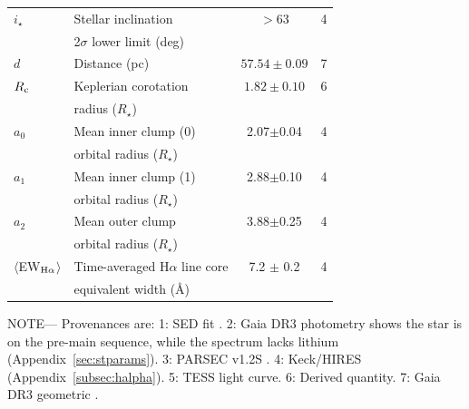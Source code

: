 \documentclass[11pt,twocolumn,tighten,linenumbers]{aastex7}
\begin{document}
\begin{table}
\begin{tabular}{llcc}
%
$i_\star$\dotfill                       & Stellar inclination\dotfill                                    & 	$>$63           & 4 \\
                                        & \hspace{3pt}  2$\sigma$ lower limit (deg)	                     &                      \\
%
$d$\dotfill                             & Distance (pc)\dotfill                                          & $57.54 \pm 0.09$ & 7 \\
%
$R_{\rm c}$\dotfill		                  & Keplerian corotation\dotfill                                   & $1.82 \pm 0.10$  & 6 \\
                                        & \hspace{3pt} radius ($R_\star$)	                               &                      \\
%
$a_0$\dotfill                           & Mean inner clump (0)\hspace{9pt}\dotfill           &  2.07$\pm$0.04   & 4 \\
                                        & \hspace{3pt} orbital radius ($R_\star$)	                       &                      \\
%
$a_1$\dotfill                           & Mean inner clump (1)\hspace{9pt}\dotfill           &  2.88$\pm$0.10   & 4 \\
                                        & \hspace{3pt} orbital radius ($R_\star$)	                       &                      \\
%
$a_2$\dotfill                           & Mean outer clump\hspace{9pt}\dotfill           &  3.88$\pm$0.25   & 4 \\
                                        & \hspace{3pt} orbital radius ($R_\star$)	                       &                      \\
%
$\langle$EW$_{\rm H\alpha}$$\rangle$    & Time-averaged H$\alpha$ line core                              &  7.2 $\pm$ 0.2   & 4 \\ 
                                        & \hspace{3pt} equivalent width (\AA)	                           &                      \\
\hline
\end{tabular}
\begin{flushleft}
\footnotesize{ \textsc{NOTE}---
Provenances are:
1: SED fit \citep{Bouma2024}.
2: Gaia DR3 photometry shows the star is on the pre-main sequence,
   while the spectrum lacks lithium (Appendix~\ref{sec:stparams}).
3: PARSEC v1.2S \citep{Chen2014}.
4: Keck/HIRES (Appendix~\ref{subsec:halpha}).
5: TESS light curve.
6: Derived quantity.
7: Gaia DR3 geometric \citep{GaiaDR3}.
}
\end{flushleft}
\vspace{-0.5cm}
\end{table}
\end{document}
